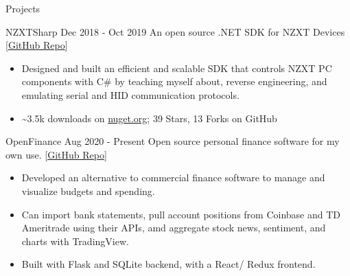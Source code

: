 \documentclass{resume} %
\begin{document}
\begin{rSection}{Projects}
    \begin{rSubsection}
        {NZXTSharp}
        {Dec 2018 - Oct 2019}
        { \normalsize An open source .NET SDK for NZXT Devices }
        {[\href{https://github.com/akmadian/NZXTSharp}{GitHub Repo}]}
        \begin{itemize}
            \setlength\itemsep{-0.25em}
            \item\small Designed and built an efficient and scalable SDK that controls NZXT PC components with C\# by teaching myself about, reverse engineering, and emulating serial and HID communication protocols.
            \item \textasciitilde 3.5k downloads on \href{https://www.nuget.org/packages/NZXTSharp}{nuget.org}; 39 Stars, 13 Forks on GitHub
        \end{itemize}
    \end{rSubsection}
    \begin{rSubsection}
        {OpenFinance}
        {Aug 2020 - Present}
        { \normalsize Open source personal finance software for my own use. }
        {[\href{https://github.com/akmadian/openfinance}{GitHub Repo}]}
        \begin{itemize}
            \setlength\itemsep{-0.2em}
            \item \small Developed an alternative to commercial finance software to manage and visualize budgets and spending.
            \item Can import bank statements, pull account positions from Coinbase and TD Ameritrade using their APIs, amd aggregate stock news, sentiment, and charts with TradingView.
            \item Built with Flask and SQLite backend, with a React/ Redux frontend.
        \end{itemize}
    \end{rSubsection}
\end{rSection}
\end{document}
